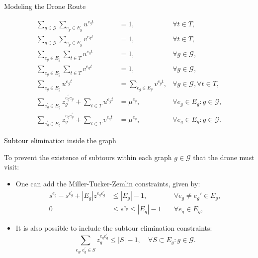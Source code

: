 \documentclass[slidestop,usepdftitle=false,10pt]{beamer}
\begin{document}
	\begin{frame}{Modeling the Drone Route}
	\begin{small}

	\begin{align}
        \sum_{g\in \mathcal G}\sum_{e_g\in E_g} u^{e_gt} & = 1, &\forall t\in T \label{st:DEnt},\\%
        \sum_{g\in\mathcal G}\sum_{e_g\in E_g} v^{e_gt} & = 1, &\forall t\in T, \label{st:DExt}\\%
        \sum_{e_g\in E_g} \sum_{t\in T} u^{e_gt} & = 1, &\forall g\in\mathcal G, \label{st:DEng}\\%
        \sum_{e_g\in E_g}\sum_{t\in T} v^{e_gt} & = 1, &\forall g\in\mathcal G, \label{st:DExg}\\%
        \sum_{e_g\in E_g} u^{e_gt} & = \sum_{e_g\in E_g} v^{e_gt}, &\forall g\in\mathcal G, \forall t\in T, \label{st:Duv}\\%
        \sum_{e^\prime_g\in E_g} z_g^{e^\prime_ge_g} + \sum_{t\in T} u^{e_gt} & = \mu^{e_g}, &\forall e_g\in E_g:g\in\mathcal G, \label{st:DInu}\\
        \sum_{e^\prime_g\in E_g} z_g^{e_ge^\prime_g} + \sum_{t\in T} v^{e_gt} & = \mu^{e_g}, &\forall e_g\in E_g:g\in\mathcal G. \label{st:DInv}
    \end{align}
    \end{small}
	\end{frame}
	
	\begin{frame}{Subtour elimination inside the graph}
	    \begin{small}
		To prevent the existence of subtours within each graph $g\in \mathcal G$ that the drone must visit: 
		\begin{itemize}
		\item One can add the Miller-Tucker-Zemlin constraints, given by:
    		\begin{align}
    		    s^{e_g} - s^{e^\prime_g} + |E_g|z^{e_ge^\prime_g} & \leq |E_g| - 1  , &\quad\forall e_g \neq e_g'\in E_g \tag{MTZ$_1$}, \label{MTZ1}\\
                0 & \leq s^{e_g} \leq |E_g| - 1 &\quad\forall e_g\in E_g\tag{MTZ$_2$},\label{MTZ2}
                \end{align}
        \item It is also possible to include the subtour elimination constraints:
        \begin{equation}\tag{SEC}\label{SEC}
        \sum_{e_g, e^\prime_g \in S} z_g^{e_ge^\prime_g} \leq |S| - 1, \quad \forall S\subset E_g:g\in \mathcal G.
    \end{equation}
    \end{itemize}
    \end{small}
	    
	\end{frame}
	
\end{document}
